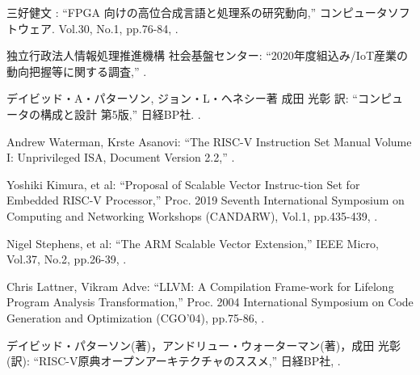 {\small 三好健文 : %
\newblock ``FPGA 向けの高位合成言語と処理系の研究動向,''
\newblock コンピュータソフトウェア. 
\newblock Vol.30,
\newblock No.1,
\newblock pp.76-84,
.}


{\small 独立行政法人情報処理推進機構 社会基盤センター: %
\newblock ``2020年度組込み/IoT産業の動向把握等に関する調査,''
.}

{\small デイビッド・A・パターソン, ジョン・L・ヘネシー著 成田 光彰 訳: %
\newblock ``コンピュータの構成と設計 第5版,''
\newblock 日経BP社. 
.}

{\small Andrew Waterman, Krste Asanovi: %
\newblock ``The RISC-V Instruction Set Manual Volume I: Unprivileged ISA, Document Version 2.2,''
.}

{\small Yoshiki Kimura, et al:      %
\newblock ``Proposal of Scalable Vector Instruc-tion Set for Embedded RISC-V Processor,''
\newblock Proc. 2019 Seventh International Symposium on Computing and Networking Workshops (CANDARW),
\newblock Vol.1,
\newblock pp.435-439,
.}

{\small Nigel Stephens, et al:      %
\newblock ``The ARM Scalable Vector Extension,''
\newblock IEEE Micro,
\newblock Vol.37,
\newblock No.2,
\newblock pp.26-39,
.}

{\small Chris Lattner, Vikram Adve:      %
\newblock ``LLVM: A Compilation Frame-work for Lifelong Program Analysis Transformation,''
\newblock Proc. 2004 International Symposium on Code Generation and Optimization (CGO’04),
\newblock pp.75-86,
.}

{\small デイビッド・パターソン(著)，アンドリュー・ウォーターマン(著)，成田 光彰(訳):      %
\newblock ``RISC-V原典オープンアーキテクチャのススメ,''
\newblock 日経BP社,
.}


